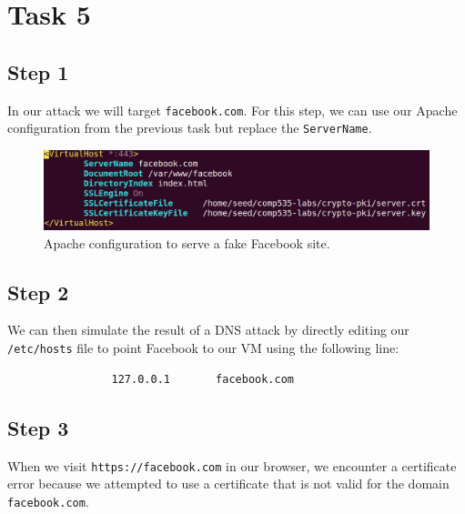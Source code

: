 \documentclass[12pt,letterpaper]{article}
\begin{document}
	\section*{Task 5}
		\subsection*{Step 1}
			In our attack we will target \texttt{facebook.com}. For this step, we can
			use our Apache configuration from the previous task but replace the \texttt{ServerName}.
			
			\begin{figure}[h!]
				\includegraphics[width=\linewidth]{task-5-1}
				\caption{Apache configuration to serve a fake Facebook site.}
			\end{figure}
		
		\subsection*{Step 2}
			We can then simulate the result of a DNS attack by directly editing our \texttt{/etc/hosts} file to point Facebook to our VM using the following line:
			
			\begin{verbatim}
				127.0.0.1       facebook.com
			\end{verbatim}
			
		\subsection*{Step 3}
			When we visit \texttt{https://facebook.com} in our browser, we encounter a certificate error because we attempted to use a certificate that is not valid for the domain \texttt{facebook.com}.
			
\end{document}
